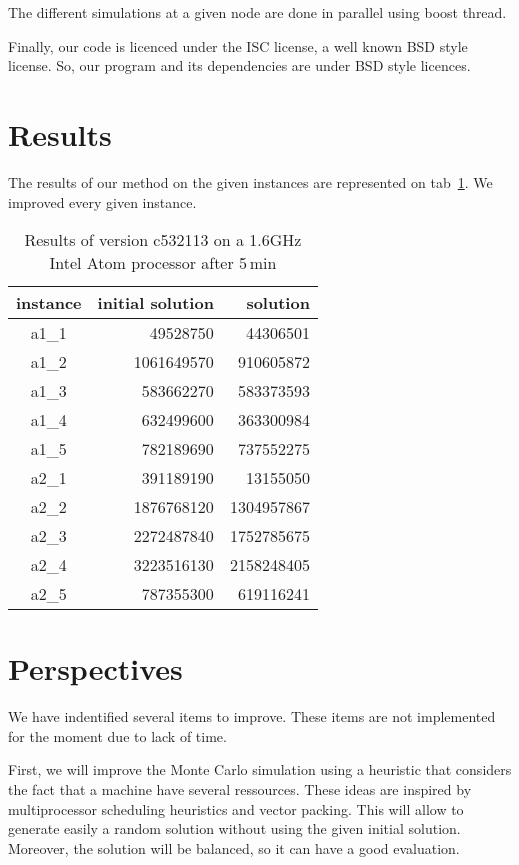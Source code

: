 \documentclass[a4paper,twocolumn]{article}
\begin{document}
The different simulations at a given node are done in parallel using
boost thread.

Finally, our code is licenced under the ISC license, a well known BSD
style license.  So, our program and its dependencies are under BSD
style licences.

\section{Results}

The results of our method on the given instances are represented on
tab~\ref{tab:results}.  We improved every given instance.

\begin{table}
  \centering
  \label{tab:results}
  \caption{Results of version c532113 on a 1.6GHz Intel Atom processor
    after 5\,min}
  \begin{tabular}{|c|r|r|}
    \hline
    instance & initial solution & solution\\
    \hline
    a1\_1 &   49528750 & 44306501  \\
    a1\_2 & 1061649570 & 910605872 \\
    a1\_3 &  583662270 & 583373593 \\
    a1\_4 &  632499600 & 363300984 \\
    a1\_5 &  782189690 & 737552275 \\
    a2\_1 &  391189190 & 13155050  \\
    a2\_2 & 1876768120 & 1304957867\\
    a2\_3 & 2272487840 & 1752785675\\
    a2\_4 & 3223516130 & 2158248405\\
    a2\_5 &  787355300 & 619116241 \\
    \hline
  \end{tabular}
\end{table}

\section{Perspectives}

We have indentified several items to improve. These items are not
implemented for the moment due to lack of time.

First, we will improve the Monte Carlo simulation using a heuristic
that considers the fact that a machine have several
ressources.  These ideas are inspired by multiprocessor scheduling
heuristics and vector packing.  This will allow to generate easily a
random solution without using the given initial solution. Moreover,
the solution will be balanced, so it can have a good evaluation.
\end{document}
